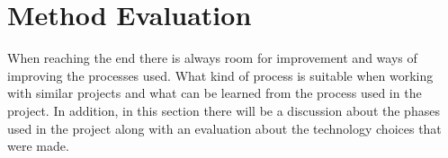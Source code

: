 \section{Method Evaluation }
When reaching the end there is always room for improvement and ways of improving the processes used. What kind of process is suitable when working with similar projects and what can be learned from the process used in the project. In addition, in this section there will be a discussion about the phases used in the project along with an evaluation about the technology choices that were made. 






